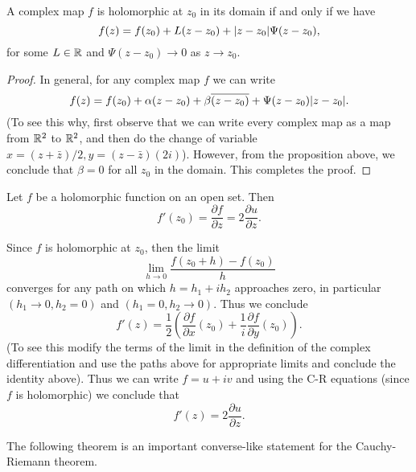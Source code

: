 \begin{corollary}
	A complex map $ f $ is holomorphic at $ z_0 $ in its domain if and only if we have
	\[ f(z) = f(z_0) + L(z-z_0) +  |z-z_0|\Psi(z-z_0),  \]
	for some $ L \in \mathbb{R} $ and $ \Psi(z-z_0) \to 0 $ as $ z\to z_0 $.
\end{corollary}
\begin{proof}
	In general, for any complex map $ f $ we can write
	\[ f(z) = f(z_0) + \alpha (z-z_0) + \beta\overline{(z - z_0)} + \Psi(z-z_0) |z-z_0|. \]
	(To see this why, first observe that we can write every complex map as a map from $ \mathbb{R}^2$ to $ \mathbb{R}^2 $, and then do the change of variable $ x=(z+\bar{z})/2, y = (z-\bar{z})(2i)$). However, from the proposition above, we conclude that $ \beta =0  $ for all $ z_0 $ in the domain. This completes the proof.
\end{proof}


\begin{proposition}
	Let $ f $ be a holomorphic function on an open set. Then
	\[ f'(z_0) = \frac{\partial f}{\partial z}= 2 \frac{\partial u}{\partial z}. \]
\end{proposition}
Since $ f $ is holomorphic at $ z_0 $, then the limit
\[ \lim_{h\to 0}\frac{f(z_0 + h) - f(z_0)}{h} \]
converges for any path on which  $ h = h_1 + i h_2 $ approaches zero, in particular $ (h_1 \to 0, h_2 = 0) $ and $ (h_1=0, h_2 \to 0) $. Thus we conclude 
\[ f'(z) = \frac12 (\frac{\partial f}{\partial x}(z_0) + \frac{1}{i}\frac{\partial f}{\partial y}(z_0)). \]
(To see this modify the terms of the limit in the definition of the complex differentiation and use the paths above for appropriate limits and conclude the identity above). Thus we can write $ f = u + iv $ and using the C-R equations (since $ f $ is holomorphic) we conclude that
\[ f'(z) = 2 \frac{\partial u}{\partial z}. \]

The following theorem is an important converse-like statement for the Cauchy-Riemann theorem.

